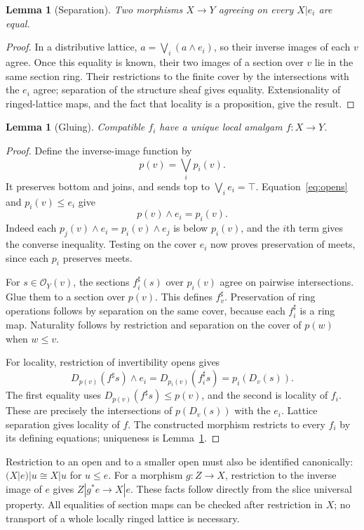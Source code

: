 \documentclass[11pt]{amsart}
\newtheorem{lemma}[theorem]{Lemma}
\theoremstyle{remark}\newtheorem{remark}[theorem]{Remark}
\begin{document}
\begin{lemma}[Separation]\label{lem:separation}
Two morphisms $X\to Y$ agreeing on every $X|e_i$ are equal.
\end{lemma}
\begin{proof}
In a distributive lattice, $a=\bigvee_i(a\wedge e_i)$, so their inverse
images of each $v$ agree. Once this equality is known, their two images
of a section over $v$ lie in the same section ring. Their restrictions
to the finite cover by the intersections with the $e_i$ agree; separation
of the structure sheaf gives equality. Extensionality of ringed-lattice
maps, and the fact that locality is a proposition, give the result.
\end{proof}

\begin{lemma}[Gluing]\label{lem:gluing}
Compatible $f_i$ have a unique local amalgam $f:X\to Y$.
\end{lemma}
\begin{proof}
Define the inverse-image function by
\[
 p(v)=\bigvee_i p_i(v).
\]
It preserves bottom and joins, and sends top to $\bigvee_i e_i=\top$.
Equation~\eqref{eq:opens} and $p_i(v)\leq e_i$ give
\[
 p(v)\wedge e_i=p_i(v).
\]
Indeed each $p_j(v)\wedge e_i=p_i(v)\wedge e_j$ is below $p_i(v)$,
and the $i$th term gives the converse inequality. Testing on the cover
$e_i$ now proves preservation of meets, since each $p_i$ preserves meets.

For $s\in\mathcal O_Y(v)$, the sections $f_i^\sharp(s)$ over $p_i(v)$
agree on pairwise intersections. Glue them to a section over $p(v)$.
This defines $f^\sharp_v$. Preservation of ring operations follows by
separation on the same cover, because each $f_i^\sharp$ is a ring map.
Naturality follows by restriction and separation on the cover of $p(w)$
when $w\leq v$.

For locality, restriction of invertibility opens gives
\[
 D_{p(v)}(f^\sharp s)\wedge e_i
   =D_{p_i(v)}(f_i^\sharp s)=p_i(D_v(s)).
\]
The first equality uses $D_{p(v)}(f^\sharp s)\leq p(v)$, and the
second is locality of $f_i$. These are precisely the intersections of
$p(D_v(s))$ with the $e_i$. Lattice separation gives locality of $f$.
The constructed morphism restricts to every $f_i$ by its defining
equations; uniqueness is Lemma~\ref{lem:separation}.
\end{proof}

Restriction to an open and to a smaller open must also be identified
canonically: $(X|e)|u\cong X|u$ for $u\leq e$. For a morphism $g:Z\to X$,
restriction to the inverse image of $e$ gives $Z|g^*e\to X|e$.
These facts follow directly from the slice universal property. All
equalities of section maps can be checked after restriction in $X$;
no transport of a whole locally ringed lattice is necessary.
\end{document}
